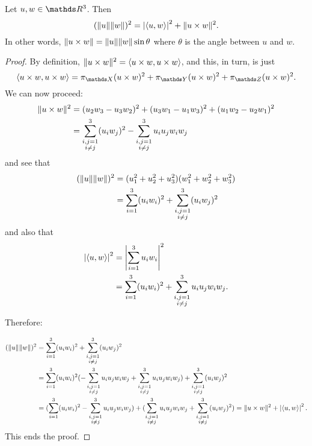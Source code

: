 \begin{theorem}
	Let $u,w\in \R^3$. Then $$(\lVert u\rVert\lVert w\rVert)^2=\left\vert\langle u,w\rangle\right\vert^2+\lVert u\times w\rVert^2.$$In other words, $\lVert u\times w\rVert=\lVert u\rVert\lVert w\rVert\sin\theta$ where $\theta$ is the angle between $u$ and $w$.
\end{theorem}
\begin{proof}
	By definition, $\lVert u\times w\rVert^2=\langle u\times w,u\times w\rangle$, and this, in turn, is just
	\[\gen{u\times w,u\times w}=\pi_{\mathds X}(u\times w)^2+\pi_{\mathds Y}(u\times w)^2+\pi_{\mathds Z}(u\times w)^2.\]We can now proceed:
	\begin{align*}
		\lVert u\times w\rVert^2&=(u_2w_3-u_3w_2)^2+(u_3w_1-u_1w_3)^2+(u_1w_2-u_2w_1)^2\\
		&=\sum_{\substack{i,j=1\\i\neq j
		}}^3(u_iw_j)^2-\sum_{\substack{i,j=1\\i\neq j}}^3u_iu_jw_iw_j
	\end{align*}and see that 
	\begin{align*}
		(\lVert u\rVert\lVert w\rVert)^2&=(u_1^2+u_2^2+u_3^2)(w_1^2+w_2^2+w_3^2)\\
		&=\sum_{i=1}^3(u_iw_i)^2+\sum_{\substack{i,j=1\\i\neq j
		}}^3(u_iw_j)^2
	\end{align*}and also that
	\begin{align*}
		\left\vert\langle u,w\rangle\right\vert^2&=\left\vert\sum_{i=1}^3u_iw_i\right\vert^2\\
		&=\sum_{i=1}^3(u_iw_i)^2+\sum_{\substack{i,j=1\\i\neq j}}^3u_iu_jw_iw_j.
	\end{align*}
	
	Therefore:
	
	\begin{align*}
	(\lVert u\rVert\lVert w\rVert)^2&=\sum_{i=1}^3(u_iw_i)^2+\sum_{\substack{i,j=1\\i\neq j
	}}^3(u_iw_j)^2\\
	&=\sum_{i=1}^3(u_iw_i)^2(-\sum_{\substack{i,j=1\\i\neq j}}^3u_iu_jw_iw_j+\sum_{\substack{i,j=1\\i\neq j}}^3u_iu_jw_iw_j)+\sum_{\substack{i,j=1\\i\neq j
	}}^3(u_iw_j)^2\\
	&=(\sum_{i=1}^3(u_iw_i)^2-\sum_{\substack{i,j=1\\i\neq j}}^3u_iu_jw_iw_j)+(\sum_{\substack{i,j=1\\i\neq j}}^3u_iu_jw_iw_j+\sum_{\substack{i,j=1\\i\neq j
	}}^3(u_iw_j)^2)=\lVert u\times w\rVert^2+\left\vert\langle u,w\rangle\right\vert^2.
	\end{align*}This ends the proof.
\end{proof}

